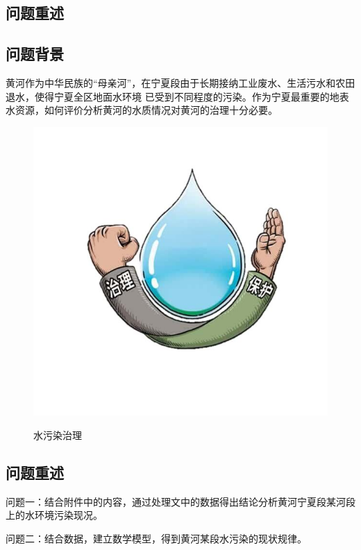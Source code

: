 \documentclass{whutmod}
\begin{document}
\begin{spacing}{1.2}
\begin{abstract}
\end{abstract}


\tableofcontents
\thispagestyle{empty}

\newpage
\setcounter{page}{1}

\section{问题重述}



	\subsection{问题背景}
	黄河作为中华民族的“母亲河”，在宁夏段由于长期接纳工业废水、生活污水和农田退水，使得宁夏全区地面水环境
	已受到不同程度的污染。作为宁夏最重要的地表水资源，如何评价分析黄河的水质情况对黄河的治理十分必要。

\begin{figure}[H]
		\centering
		\includegraphics[width=.6\textwidth]{背景.png}
		\label{上下车人数示意图}
		\caption{水污染治理}
\end{figure}


\subsection{问题重述}

	问题一：结合附件中的内容，通过处理文中的数据得出结论分析黄河宁夏段某河段上的水环境污染现况。

	问题二：结合数据，建立数学模型，得到黄河某段水污染的现状规律。


\end{spacing}
\end{document}
